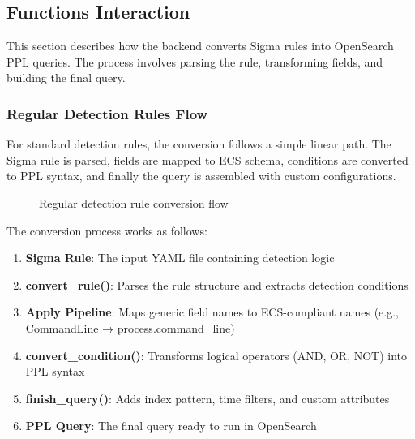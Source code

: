 \subsection{Functions Interaction}

This section describes how the backend converts Sigma rules into OpenSearch PPL queries. The process involves parsing the rule, transforming fields, and building the final query.

\subsubsection{Regular Detection Rules Flow}

For standard detection rules, the conversion follows a simple linear path. The Sigma rule is parsed, fields are mapped to ECS schema, conditions are converted to PPL syntax, and finally the query is assembled with custom configurations.

\begin{figure}[htbp]
\centering
{}
\caption{Regular detection rule conversion flow}
\label{fig:regular_rule_flow}
\end{figure}

The conversion process works as follows:
\begin{enumerate}
    \item \textbf{Sigma Rule}: The input YAML file containing detection logic
    \item \textbf{convert\_rule()}: Parses the rule structure and extracts detection conditions
    \item \textbf{Apply Pipeline}: Maps generic field names to ECS-compliant names (e.g., CommandLine → process.command\_line)
    \item \textbf{convert\_condition()}: Transforms logical operators (AND, OR, NOT) into PPL syntax
    \item \textbf{finish\_query()}: Adds index pattern, time filters, and custom attributes
    \item \textbf{PPL Query}: The final query ready to run in OpenSearch
\end{enumerate}

